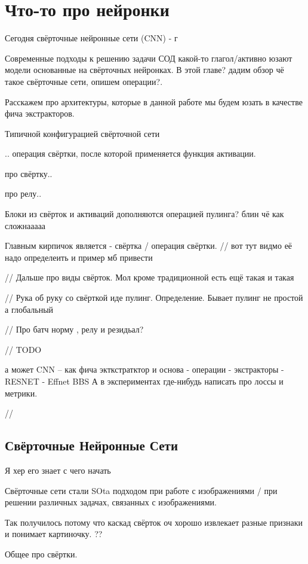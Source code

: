 \section{Что-то про нейронки}

Сегодня свёрточные нейронные сети (CNN) - г

Современные подходы к решению задачи СОД какой-то глагол/активно юзают модели основанные на 
свёрточных нейронках. В этой главе? дадим обзор чё такое  свёрточные сети, опишем операции?. 

Расскажем про архитектуры, которые в данной работе мы будем юзать в качестве фича экстракторов.



Типичной конфигурацией свёрточной сети 

.. операция свёртки, после которой применяется функция активации.

про свёртку..

про релу..

Блоки из свёрток и активаций дополняются операцией пулинга?  блин чё как сложнааааа

Главным кирпичок является - свёртка / операция свёртки.
// вот тут видмо её надо определеить и пример мб привести

// Дальше про виды свёрток. Мол кроме традиционной есть ещё такая и такая  

// Рука об руку со свёрткой иде пулинг. Определение. Бывает пулинг не простой а глобальный

// Про батч норму , релу и резидьал? 


// TODO

а может 
CNN       -- как фича экткстратктор и основа
 - операции
 - экстракторы
    - RESNET
    - Effnet
BBS
А в экспериментах где-нибудь написать про лоссы и метрики.

//

\subsection{Свёрточные Нейронные Сети}

Я хер его знает с чего начать

Свёрточные сети стали SOta подходом при работе с изображениями / при решении различных задачах, связанных с изображениями.

Так получилось потому что каскад свёрток оч хорошо извлекает разные признаки и понимает картиночку. ?? 




Общее про свёртки.

